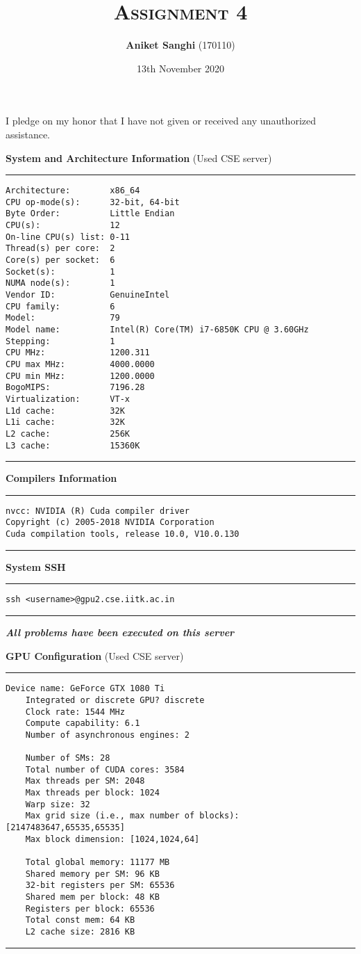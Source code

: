 \documentclass[a4paper]{article}
\title{\textsc{Assignment 4}}
\author{\textbf{Aniket Sanghi} (170110)}
\date{13th November 2020}
\begin{document}
\maketitle
\thispagestyle{fancy}
\fancyhead{}
\cfoot{\thepage}
\begin{center}
I pledge on my honor that I have not given or received any unauthorized assistance.\\
\end{center}
\vspace{1cm}
{\Large\bf System and Architecture Information } (Used CSE server)
\vspace{0.5cm}
\hrule
\begin{lstlisting}
Architecture:        x86_64
CPU op-mode(s):      32-bit, 64-bit
Byte Order:          Little Endian
CPU(s):              12
On-line CPU(s) list: 0-11
Thread(s) per core:  2
Core(s) per socket:  6
Socket(s):           1
NUMA node(s):        1
Vendor ID:           GenuineIntel
CPU family:          6
Model:               79
Model name:          Intel(R) Core(TM) i7-6850K CPU @ 3.60GHz
Stepping:            1
CPU MHz:             1200.311
CPU max MHz:         4000.0000
CPU min MHz:         1200.0000
BogoMIPS:            7196.28
Virtualization:      VT-x
L1d cache:           32K
L1i cache:           32K
L2 cache:            256K
L3 cache:            15360K
\end{lstlisting}
\hrule 
\vspace{0.5cm}
{\Large\bf Compilers Information } 
\vspace{0.5cm}
\hrule
\begin{lstlisting}
nvcc: NVIDIA (R) Cuda compiler driver
Copyright (c) 2005-2018 NVIDIA Corporation
Cuda compilation tools, release 10.0, V10.0.130
\end{lstlisting}
\hrule 
\vspace{0.5cm}
{\Large\bf System SSH } 
\vspace{0.5cm}
\hrule
\begin{lstlisting}
ssh <username>@gpu2.cse.iitk.ac.in
\end{lstlisting}
\hrule 
\vspace{1cm}
{\bf \emph{All problems have been executed on this server}}

\newpage

{\Large\bf GPU Configuration } (Used CSE server)
\vspace{0.5cm}
\hrule
\begin{lstlisting}
Device name: GeForce GTX 1080 Ti
	Integrated or discrete GPU? discrete
	Clock rate: 1544 MHz
	Compute capability: 6.1
	Number of asynchronous engines: 2

	Number of SMs: 28
	Total number of CUDA cores: 3584
	Max threads per SM: 2048
	Max threads per block: 1024
	Warp size: 32
	Max grid size (i.e., max number of blocks): [2147483647,65535,65535]
	Max block dimension: [1024,1024,64]

	Total global memory: 11177 MB
	Shared memory per SM: 96 KB
	32-bit registers per SM: 65536
	Shared mem per block: 48 KB
	Registers per block: 65536
	Total const mem: 64 KB
	L2 cache size: 2816 KB
\end{lstlisting}
\hrule 
\vspace{0.5cm}
\end{document}
